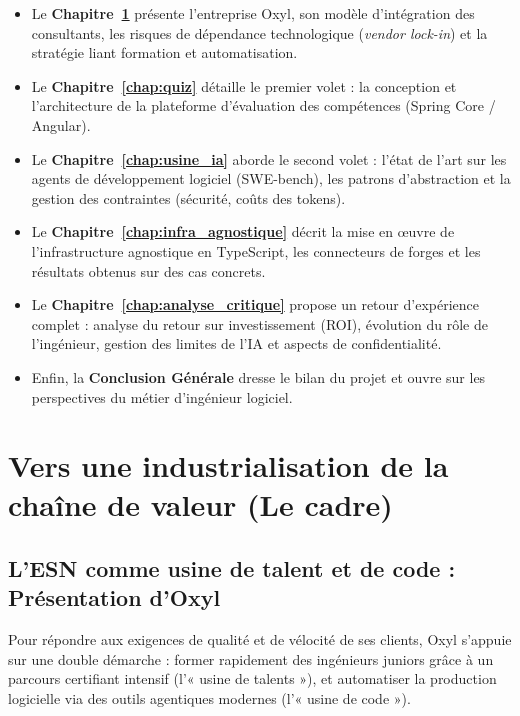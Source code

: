 \documentclass{tnreport}
\def\reportCompany{Oxyl} %
\begin{document}
\begin{itemize}
    \item Le \textbf{Chapitre~\ref{chap:cadre}} présente l'entreprise Oxyl, son modèle d'intégration des consultants, les risques de dépendance technologique (\textit{vendor lock-in}) et la stratégie liant formation et automatisation.
    \item Le \textbf{Chapitre~\ref{chap:quiz}} détaille le premier volet : la conception et l'architecture de la plateforme d'évaluation des compétences (Spring Core / Angular).
    \item Le \textbf{Chapitre~\ref{chap:usine_ia}} aborde le second volet : l'état de l'art sur les agents de développement logiciel (SWE-bench), les patrons d'abstraction et la gestion des contraintes (sécurité, coûts des tokens).
    \item Le \textbf{Chapitre~\ref{chap:infra_agnostique}} décrit la mise en œuvre de l'infrastructure agnostique en TypeScript, les connecteurs de forges et les résultats obtenus sur des cas concrets.
    \item Le \textbf{Chapitre~\ref{chap:analyse_critique}} propose un retour d'expérience complet : analyse du retour sur investissement (ROI), évolution du rôle de l'ingénieur, gestion des limites de l'IA et aspects de confidentialité.
    \item Enfin, la \textbf{Conclusion Générale} dresse le bilan du projet et ouvre sur les perspectives du métier d'ingénieur logiciel.
\end{itemize}

\cleardoublepage

\chapter{Vers une industrialisation de la chaîne de valeur (Le cadre)}
\label{chap:cadre}

\section{L'ESN comme \og usine \fg{} de talent et de code : Présentation d'Oxyl}
\label{sec:usine_talent}

Pour répondre aux exigences de qualité et de vélocité de ses clients, \reportCompany{} s'appuie sur une double démarche : former rapidement des ingénieurs juniors grâce à un parcours certifiant intensif (l'« usine de talents »), et automatiser la production logicielle via des outils agentiques modernes (l'« usine de code »).
\end{document}
